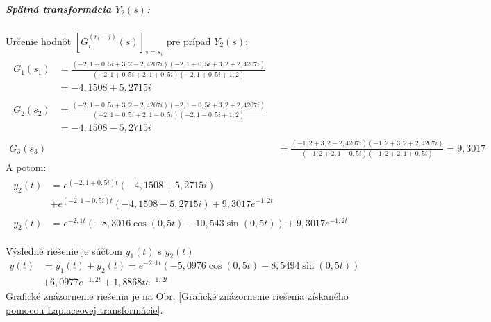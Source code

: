 \documentclass[a4paper, 10pt, ]{article}
\begin{document}
\subparagraph{Spätná transformácia $Y_2(s)$:}
Určenie hodnôt $\left[ G_i^{(r_i-j)} (s) \right]_{s = s_i}$ pre prípad $Y_2(s)$:
\begin{subequations}
	\begin{align}
        \begin{split}
		G_1(s_1) &= \frac{\left( -2,1 + 0,5i + 3,2 - 2,4207i \right)\left( -2,1 + 0,5i + 3,2 + 2,4207i \right)}
		                 {\left( -2,1 + 0,5i + 2,1 + 0,5i \right)\left( -2,1 + 0,5i + 1,2 \right) }
		                 \\&= -4,1508 + 5,2715i
        \end{split}\\
        \begin{split}
		G_2(s_2) &= \frac{\left( -2,1 - 0,5i + 3,2 - 2,4207i \right)\left( -2,1 - 0,5i + 3,2 + 2,4207i \right)}
		                 {\left( -2,1 - 0,5i + 2,1 - 0,5i \right)\left( -2,1 - 0,5i + 1,2 \right) }
		                 \\&= -4,1508 - 5,2715i
        \end{split}\\
		G_3(s_3) &= \frac{\left( -1,2 + 3,2 - 2,4207i \right)\left( -1,2 + 3,2 + 2,4207i \right)}
		                 {\left( -1,2 + 2,1 - 0,5i \right)\left( -1,2 + 2,1 + 0,5i \right) }
		                 = 9,3017
	\end{align}
\end{subequations}
A potom:
\begin{subequations}
	\begin{align}
		\begin{split}
			y_2(t) &= e^{(-2,1 + 0,5i)t}\left( -4,1508 + 5,2715i \right) \\&+ e^{(-2,1 - 0,5i)t}\left( -4,1508 - 5,2715i \right) + 9,3017 e^{-1,2t}
		\end{split}	\\
		\begin{split}
			y_2(t) &= e^{-2,1t} \left( -8,3016 \cos(0,5t) -10,543 \sin(0,5t) \right) + 9,3017 e^{-1,2t}
		\end{split}
	\end{align}
\end{subequations}




Výsledné riešenie je súčtom $y_1(t)$ s $y_2(t)$
\begin{equation}
	\begin{split}
		y(t) &= y_1(t) + y_2(t) = e^{-2,1t} \left( -5,0976 \cos(0,5t) -8,5494 \sin(0,5t) \right) \\&+6,0977 e^{-1,2t} + 1,8868te^{-1,2t}
	\end{split}
\end{equation}
Grafické znázornenie riešenia je na Obr. \ref{Grafické znázornenie riešenia získaného pomocou Laplaceovej transformácie}.
\end{document}
